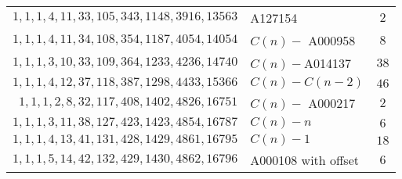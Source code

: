 \begin{longtabu}{|r|l|c|}
    \(1,    1,    1,    4,   11,   33,  105,  343, 1148, 3916, 13563\)  & A127154 &\(2\)\\
    \(1,    1,    1,    4,   11,   34,  108,  354, 1187, 4054, 14054\)  & \(C(n) -\) A000958 &\(8\)\\
    \(1,    1,    1,    3,   10,   33,  109,  364, 1233, 4236, 14740\)  & \(C(n) -\)A014137 &\(38\)\\
    \(1,    1,    1,    4,   12,   37,  118,  387, 1298, 4433, 15366\)  & \(C(n) - C(n-2)\) &\(46\)\\
    \(1,    1,    1,    2,    8,   32,  117,  408, 1402, 4826, 16751\)  & \(C(n) -\) A000217 &\(2\)\\
    \(1,    1,    1,    3,   11,   38,  127,  423, 1423, 4854, 16787\)  & \(C(n)- n\) &\(6\)\\
    \(1,    1,    1,    4,   13,   41,  131,  428, 1429, 4861, 16795\)  & \(C(n) - 1\) &\(18\)\\
    \(1,    1,    1,    5,   14,   42,  132,  429, 1430, 4862, 16796\)  & A000108 with offset &\(6\)\\
    \hline
\end{longtabu}
